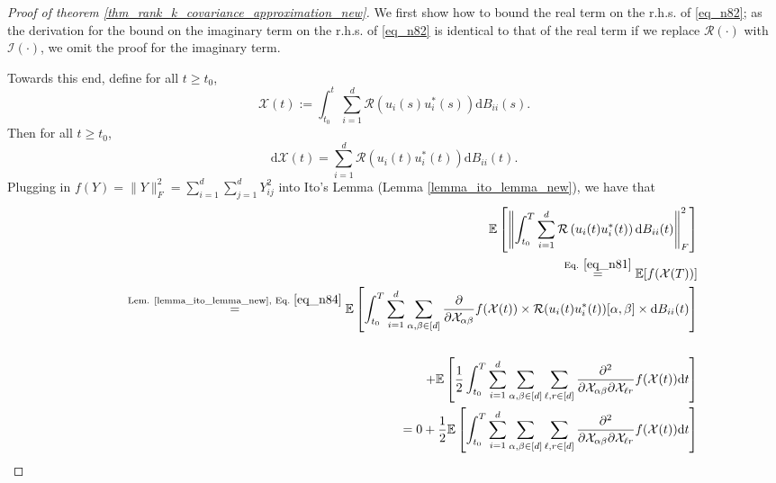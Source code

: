 \documentclass[11pt,letterpaper]{article}
\begin{document}
\begin{proof}[Proof of theorem \ref{thm_rank_k_covariance_approximation_new}]
We first show how to bound the real term on the r.h.s. of \eqref{eq_n82}; as the derivation for the bound on the imaginary term on the r.h.s. of \eqref{eq_n82} is identical to that of the real term if we replace $\mathcal{R}(\cdot)$ with $\mathcal{I}(\cdot)$, we omit the proof for the imaginary term.

  
      Towards this end, define for all $t \geq t_0$,
    \begin{equation}\label{eq_n81}
        \mathcal{X}(t) := \int_{t_0}^t \sum_{i=1}^d \mathcal{R}(u_i(s) u_i^\ast(s)) \mathrm{d}B_{i i}(s).
            \end{equation}
            Then for all $t \geq t_0$,
                \begin{equation}\label{eq_n84}
       \mathrm{d} \mathcal{X}(t) = \sum_{i=1}^d  \mathcal{R}(u_i(t) u_i^\ast(t)) \mathrm{d}B_{i i}(t).
            \end{equation}
    Plugging in $f(Y) = \|Y\|_F^2 = \sum_{i=1}^d \sum_{j=1}^d Y_{ij}^2$ into Ito's Lemma (Lemma \ref{lemma_ito_lemma_new}),
     we have that
    \begin{eqnarray}
        & & \mathbb{E}\left[\left\| \int_{t_0}^T \sum_{i=1}^d  \mathcal{R}\left(u_i(t) u_i^\ast(t)\right) \mathrm{d}B_{i i}(t)  \right\|_F^2 \right] \nonumber\\
         & & \qquad \stackrel{\textrm{Eq. } \eqref{eq_n81}}{=} \mathbb{E}[f(\mathcal{X}(T))] \nonumber\\
                  & & \qquad  \stackrel{\textrm{Lem. \ref{lemma_ito_lemma_new}}, \, \, \textrm{Eq.} \, \, \eqref{eq_n84}}{=}                  \mathbb{E}\left[ \int_{t_0}^T  \sum_{i=1}^d  \sum_{\alpha, \beta \in [d]} \frac{\partial}{\partial \mathcal{X}_{\alpha \beta}} f(\mathcal{X}(t))\times \mathcal{R} (u_i(t) u_i^\ast(t))[\alpha, \beta] \times \mathrm{d}B_{i i}(t) \right] \nonumber\\
 \nonumber\\
                  & & \qquad \qquad \qquad \qquad \qquad +\mathbb{E}\left[ \frac{1}{2} \int_{t_0}^T \sum_{i=1}^d  \sum_{\alpha, \beta \in [d]} \sum_{\ell, r \in [d]} \frac{\partial^2}{\partial \mathcal{X}_{\alpha \beta} \partial \mathcal{X}_{\ell r} } f(\mathcal{X}(t)) \mathrm{d}t \right ] \nonumber\\
                  & & \qquad = 0 +  \frac{1}{2} \mathbb{E}\left[\int_{t_0}^T \sum_{i=1}^d  \sum_{\alpha, \beta \in [d]} \sum_{\ell, r \in [d]} \frac{\partial^2}{\partial \mathcal{X}_{\alpha \beta} \partial \mathcal{X}_{\ell r} } f(\mathcal{X}(t)) \mathrm{d}t \right ] \label{eq_n80}\\

\end{eqnarray}
\end{proof}
\end{document}
